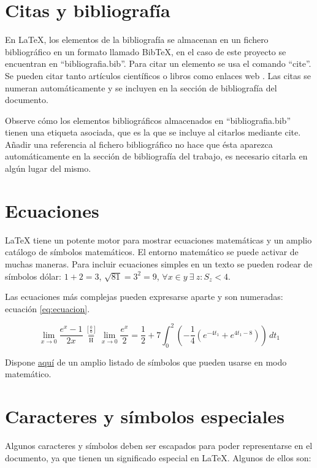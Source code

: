 \section{Citas y bibliografía}
En LaTeX, los elementos de la bibliografía se almacenan en un fichero bibliográfico en un formato llamado BibTeX, en el caso de este proyecto se encuentran en ``bibliografia.bib''. Para citar un elemento se usa el comando ``cite''. Se pueden citar tanto artículos científicos \cite{berners1994} o libros \cite{swales1994} como enlaces web \cite{redhat-apirest}. Las citas se numeran automáticamente y se incluyen en la sección de bibliografía del documento.

Observe cómo los elementos bibliográficos almacenados en ``bibliografia.bib'' tienen una etiqueta asociada, que es la que se incluye al citarlos mediante cite. Añadir una referencia al fichero bibliográfico no hace que ésta aparezca automáticamente en la sección de bibliografía del trabajo, es necesario citarla en algún lugar del mismo.

\section{Ecuaciones}
LaTeX tiene un potente motor para mostrar ecuaciones matemáticas y un amplio catálogo de símbolos matemáticos. El entorno matemático se puede activar de muchas maneras. Para incluir ecuaciones simples en un texto se pueden rodear de símbolos dólar: $1 + 2 = 3$, $\sqrt{81} = 3^2 = 9$, $\forall x \in y~\exists~z : S_z < 4$.

Las ecuaciones más complejas pueden expresarse aparte y son numeradas: ecuación \ref{eq:ecuacion}.

\begin{equation}\label{eq:ecuacion}
\lim_{x\to 0}{\frac{e^x-1}{2x}}
 \overset{\left[\frac{0}{0}\right]}{\underset{\mathrm{H}}{=}}
 \lim_{x\to 0}{\frac{e^x}{2}}={\frac{1}{2}}
 +7 \int_0^2
  \left(
    -\frac{1}{4}\left(e^{-4t_1}+e^{4t_1-8}\right)
  \right)\,dt_1
\end{equation}

Dispone \href{http://www.yann-ollivier.org/latex/texsymbols.pdf}{aquí} de un amplio listado de símbolos que pueden usarse en modo matemático.

\section{Caracteres y símbolos especiales}
Algunos caracteres y símbolos deben ser escapados para poder representarse en el documento, ya que tienen un significado especial en LaTeX. Algunos de ellos son:


